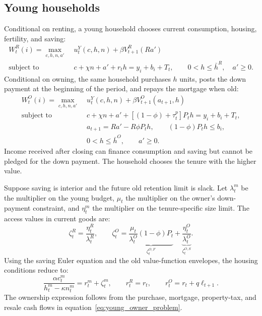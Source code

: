 \documentclass[10pt]{article}
\theoremstyle{definition}
\begin{document}
\subsection{Young households}

Conditional on renting, a young household chooses current consumption,
housing, fertility, and saving:
\begin{align}
 W_t^R(i)=\max_{c,h,n,a'}\;&u_t^Y(c,h,n)+\beta V_{t+1}^R(Ra')
 \label{eq:young_renter_problem}\\
 \text{subject to}\quad
 &c+\chi n+a'+r_th=y_i+b_i+T_t,\qquad
 0<h\leq\bar h^R,\quad a'\geq0.\nonumber
\end{align}
Conditional on owning, the same household purchases $h$ units, posts the down
payment at the beginning of the period, and repays the mortgage when old:
\begin{align}
 W_t^O(i)=\max_{c,h,n,a'}\;&u_t^Y(c,h,n)
 +\beta V_{t+1}^O(a_{t+1},h)
 \label{eq:young_owner_problem}\\
 \text{subject to}\quad
 &c+\chi n+a'+[(1-\phi)+\tau_t^p]P_th=y_i+b_i+T_t,\nonumber\\
 &a_{t+1}=Ra'-R\phi P_th,\qquad
 (1-\phi)P_th\leq b_i,\nonumber\\
 &0<h\leq\bar h^O,\qquad a'\geq0.\nonumber
\end{align}
Income received after closing can finance consumption and saving but cannot be
pledged for the down payment. The household chooses the tenure with the higher
value.

Suppose saving is interior and the future old retention limit is slack. Let
$\lambda_t^m$ be the multiplier on the young budget, $\mu_t$ the multiplier on
the owner's down-payment constraint, and $\eta_t^m$ the multiplier on the
tenure-specific size limit. The access values in current goods are:
\begin{equation}
 \zeta_t^R=\frac{\eta_t^R}{\lambda_t^R},\qquad
 \zeta_t^O=
 \underbrace{\frac{\mu_t}{\lambda_t^O}(1-\phi)P_t}_{\zeta_t^{O,F}}
 +\underbrace{\frac{\eta_t^O}{\lambda_t^O}}_{\zeta_t^{O,S}}.
 \label{eq:access_values}
\end{equation}
Using the saving Euler equation and the old value-function envelopes, the
housing conditions reduce to:
\begin{equation}
 \frac{\alpha c_t^m}{h_t^m-\kappa n_t^m}
 =r_t^m+\zeta_t^m,\qquad
 r_t^R=r_t,\qquad r_t^O=r_t+q\ell_{t+1}.
 \label{eq:housing_foc}
\end{equation}
The ownership expression follows from the purchase, mortgage, property-tax,
and resale cash flows in equation~\eqref{eq:young_owner_problem}.
\end{document}
